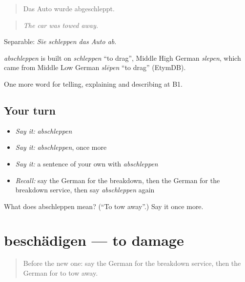 \begin{quote}
Das Auto wurde abgeschleppt.
\end{quote}

\begin{quote}
\emph{The car was towed away.}
\end{quote}

Separable: \emph{Sie schleppen das Auto ab}.

\begin{cousinweb}
\emph{abschleppen} is built on \emph{schleppen} \textquotedblleft{}to drag\textquotedblright{}, Middle High German \emph{slepen}, which came from Middle Low German \emph{slēpen} \textquotedblleft{}to drag\textquotedblright{} (EtymDB).
\end{cousinweb}

\begin{grammarlens}[title={What you've built}]
One more word for telling, explaining and describing at B1.
\end{grammarlens}

\subsection*{Your turn}
\begin{itemize}
\raggedright
  \item \emph{Say it:} \emph{abschleppen}
  \item \emph{Say it:} \emph{abschleppen}, once more
  \item \emph{Say it:} a sentence of your own with \emph{abschleppen}
  \item \emph{Recall:} say the German for the breakdown, then the German for the breakdown service, then say \emph{abschleppen} again
\end{itemize}

\begin{tcolorbox}[breakable,colback=teal!4,colframe=teal!35!black,title={Before you move on}]
What does abschleppen mean? (\textquotedblleft{}To tow away\textquotedblright{}.) Say it once more.
\end{tcolorbox}
\section[beschädigen]{beschädigen — to damage}

\label{lesson:GE-C295-beschaedigen}



\begin{quote}
Before the new one: say the German for the breakdown service, then the German for to tow away.
\end{quote}

